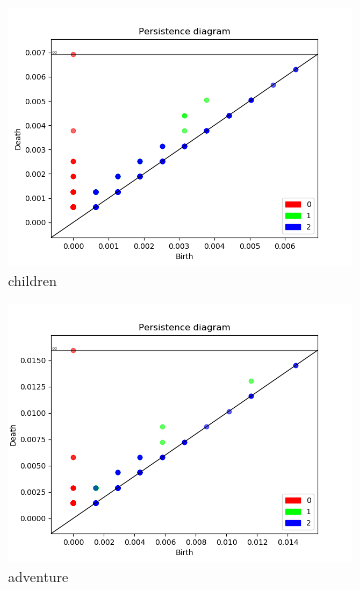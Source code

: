 \documentclass[fleqn]{article}
\begin{document}
\begin{figure}
\begin{subfigure}[t]{0.425\textwidth}
			\includegraphics[width=\textwidth]{figures/all_words/children.png}
			\caption{children}
			\label{fig:all:children}
		\end{subfigure}\hfill
		\begin{subfigure}[t]{0.425\textwidth}
			\includegraphics[width=\textwidth]{figures/all_words/adventure.png}
			\caption{adventure}
			\label{fig:all:adventure}
		\end{subfigure}\hfill
		\\
		\begin{subfigure}[t]{0.425\textwidth}

\end{subfigure}
\end{figure}
\end{document}
